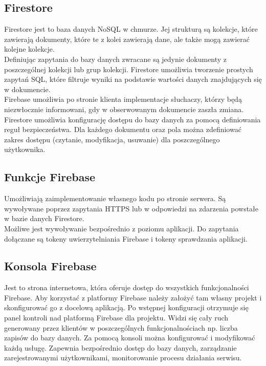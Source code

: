 \subsection{Firestore}

Firestore jest to baza danych NoSQL w chmurze. Jej strukturą są kolekcje, które zawierają dokumenty, które te z kolei zawierają dane, ale także mogą zawierać kolejne kolekcje. \\
Definiując zapytania do bazy danych zwracane są jedynie dokumenty z poszczególnej kolekcji lub grup kolekcji. Firestore umożliwia tworzenie prostych zapytań SQL, które filtruje wyniki na podstawie wartości danych znajdujących się w dokumencie. \\
Firebase umożliwia po stronie klienta implementacje słuchaczy, którzy będą niezwłocznie informowani, gdy w obserwowanym dokumencie zaszła zmiana. \\
Firestore umożliwia konfigurację dostępu do bazy danych za pomocą definiowania reguł bezpieczeństwa. Dla każdego dokumentu oraz pola można zdefiniować zakres dostępu (czytanie, modyfikacja, usuwanie) dla poszczególnego użytkownika.


\subsection{Funkcje Firebase}

Umożliwiają zaimplementowanie własnego kodu po stronie serwera. Są wywoływane poprzez zapytania HTTPS lub w odpowiedzi na zdarzenia powstałe w bazie danych Firestore. \\
Możliwe jest wywoływanie bezpośrednio z poziomu aplikacji. Do zapytania dołączane są tokeny uwierzytelniania Firebase i tokeny sprawdzania aplikacji.

\subsection{Konsola Firebase}

Jest to strona internetowa, która oferuje dostęp do wszystkich funkcjonalności Firebase. Aby korzystać z platformy Firebase należy założyć tam własny projekt i skonfigurować go z docelową aplikacją. Po wstępnej konfiguracji otrzymuje się panel kontroli nad platformą Firebase dla projektu. Widzi się cały ruch generowany przez klientów w poszczególnych funkcjonalnościach np. liczba zapisów do bazy danych. Za pomocą konsoli można konfigurować i modyfikować każdą usługę. Zapewnia bezpośrednio dostęp do bazy danych, zarządzanie zarejestrowanymi użytkownikami, monitorowanie procesu działania serwisu. 


